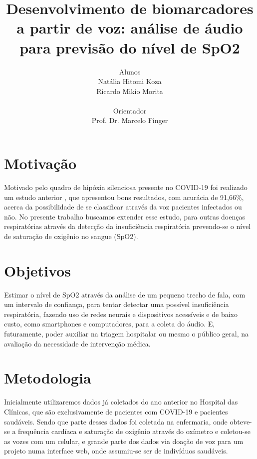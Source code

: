 \documentclass[12pt, a4paper]{article}
\begin{document}
\title{Desenvolvimento de biomarcadores a partir de voz: análise de áudio para previsão do nível de SpO2}

\author{Alunos\\ Natália Hitomi Koza \\ Ricardo Mikio Morita \\ \\Orientador\\ Prof. Dr. Marcelo Finger}
\maketitle

\section{Motivação}

Motivado pelo quadro de hipóxia silenciosa presente no COVID-19 foi realizado um estudo anterior \citep{casanova2021deep}, que apresentou bons resultados, com acurácia de 91,66\%, acerca da possibilidade de se classificar através da voz pacientes infectados ou não. No presente trabalho buscamos extender esse estudo, para outras doenças respiratórias através da detecção da insuficiência respiratória prevendo-se o nível de saturação de oxigênio no sangue (SpO2).


\section{Objetivos}

Estimar o nível de SpO2 através da análise de um pequeno trecho de fala, com um intervalo de confiança, para tentar detectar uma possível insuficiência respiratória, fazendo uso de redes neurais e dispositivos acessíveis e de baixo custo, como smartphones e computadores, para a coleta do áudio. E, futuramente, poder auxiliar na triagem hospitalar ou mesmo o público geral, na avaliação da necessidade de intervenção médica.

\section{Metodologia}

Inicialmente utilizaremos dados já coletados do ano anterior no Hospital das Clínicas, que são exclusivamente de pacientes com COVID-19 e pacientes saudáveis. Sendo que parte desses dados foi coletada na enfermaria, onde obteve-se a frequência cardíaca e saturação de oxigênio através do oxímetro e coletou-se as vozes com um celular, e grande parte dos dados via doação de voz para um projeto numa interface web, onde assumiu-se ser de indivíduos saudáveis.
\end{document}
